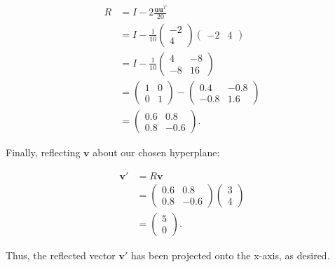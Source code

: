\begin{align*}
R &= I - 2\frac{\mathbf{u}\mathbf{u}^T}{20} \\
&= I - \frac{1}{10}\begin{pmatrix} -2 \\ 4 \end{pmatrix}\begin{pmatrix} -2 & 4 \end{pmatrix} \\
&= I - \frac{1}{10}\begin{pmatrix} 4 & -8 \\ -8 & 16 \end{pmatrix} \\
&= \begin{pmatrix} 1 & 0 \\ 0 & 1 \end{pmatrix} - \begin{pmatrix} 0.4 & -0.8 \\ -0.8 & 1.6 \end{pmatrix} \\
&= \begin{pmatrix} 0.6 & 0.8 \\ 0.8 & -0.6 \end{pmatrix}.
\end{align*}

Finally, reflecting \( \mathbf{v} \) about our chosen hyperplane:

\begin{align*}
\mathbf{v}' &= R\mathbf{v} \\
&= \begin{pmatrix} 0.6 & 0.8 \\ 0.8 & -0.6 \end{pmatrix}\begin{pmatrix} 3 \\ 4 \end{pmatrix} \\
&= \begin{pmatrix} 5 \\ 0 \end{pmatrix}.
\end{align*}

Thus, the reflected vector \( \mathbf{v}' \) has been projected onto the x-axis, as desired.

